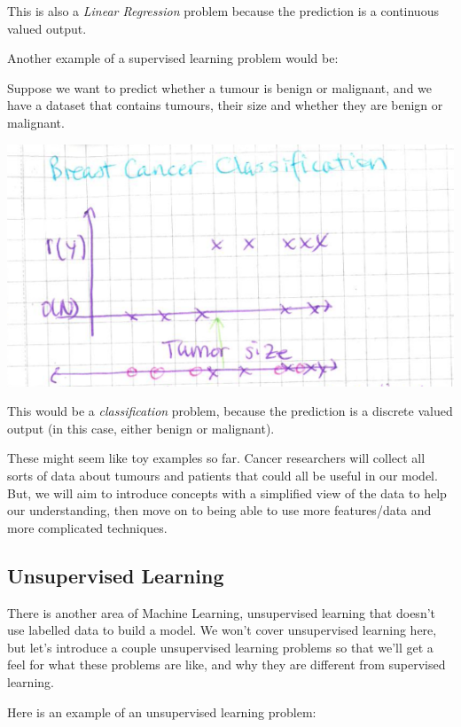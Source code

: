\documentclass[12pt]{article}
\begin{document}
This is also a \textit{Linear Regression} problem because the prediction is a continuous valued output. 

Another example of a supervised learning problem would be:

Suppose we want to predict whether a tumour is benign or malignant, and we have a dataset that contains tumours, their size and whether they are benign or malignant.

\includegraphics[width={\textwidth}]{tumour-size}

This would be a \textit{classification} problem, because the prediction is a discrete valued output (in this case, either benign or malignant). 

These might seem like toy examples so far. Cancer researchers will collect all sorts of data about tumours and patients that could all be useful in our model. But, we will aim to introduce concepts with a simplified view of the data to help our understanding, then move on to being able to use more features/data and more complicated techniques.

\subsection{Unsupervised Learning}

There is another area of Machine Learning, unsupervised learning that doesn't use labelled data to build a model. We won't cover unsupervised learning here, but let's introduce a couple unsupervised learning problems so that we'll get a feel for what these problems are like, and why they are different from supervised learning.

Here is an example of an unsupervised learning problem:
\end{document}
